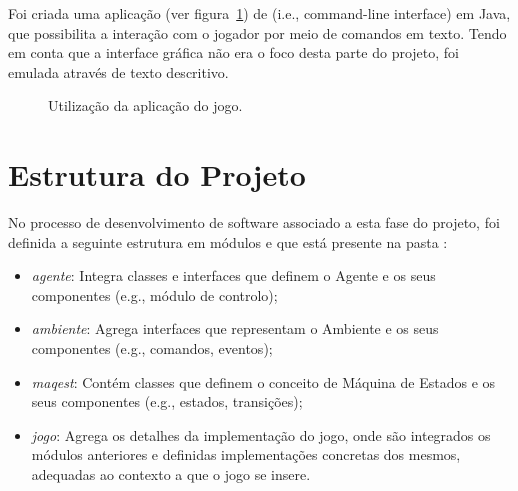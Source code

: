 Foi criada uma aplicação (ver figura~\ref{fig:projeto-parte1-jogo}) de  (i.e., command-line interface) em Java, que possibilita a interação com o jogador por meio de comandos em texto.
Tendo em conta que a interface gráfica não era o foco desta parte do projeto, foi emulada através de texto descritivo.

\begin{figure}[H]
    \begin{center}
    \end{center}
    \caption{Utilização da aplicação do jogo.}\label{fig:projeto-parte1-jogo}
\end{figure}


\section{Estrutura do Projeto}\label{sec:estrutura-do-projeto}

No processo de desenvolvimento de software associado a esta fase do projeto, foi definida a seguinte estrutura em módulos e que está presente na pasta :

\begin{itemize}
    \item \textit{agente}: Integra classes e interfaces que definem o Agente e os seus componentes (e.g., módulo de controlo);
    \item \textit{ambiente}: Agrega interfaces que representam o Ambiente e os seus componentes (e.g., comandos, eventos);
    \item \textit{maqest}: Contém classes que definem o conceito de Máquina de Estados e os seus componentes (e.g., estados, transições);
    \item \textit{jogo}: Agrega os detalhes da implementação do jogo, onde são integrados os módulos anteriores e definidas implementações concretas dos mesmos, adequadas ao contexto a que o jogo se insere.
\end{itemize}
